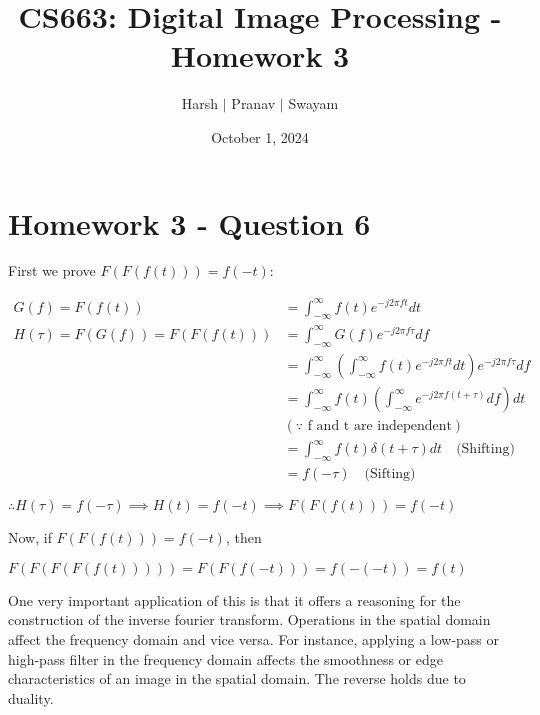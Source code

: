 \documentclass{article}
\title{CS663: Digital Image Processing - Homework 3}
\author{Harsh $\vert$ Pranav $\vert$ Swayam}
\date{October 1, 2024}
\begin{document}
\maketitle
\section{Homework 3 - Question 6}

First we prove \( F(F(f(t))) = f(-t) \):

\begin{align*}
    G(f) = F(f(t)) &= \int_{-\infty}^{\infty} f(t) e^{-j 2 \pi f t} dt \\
    H(\tau) = F(G(f)) = F(F(f(t))) &= \int_{-\infty}^{\infty} G(f) e^{-j 2 \pi f \tau} df \\
    &= \int_{-\infty}^{\infty} \left( \int_{-\infty}^{\infty} f(t) e^{-j 2 \pi f t} dt \right) e^{-j 2 \pi f \tau} df \\
    &= \int_{-\infty}^{\infty} f(t) \left( \int_{-\infty}^{\infty} e^{-j 2 \pi f (t + \tau)} df \right) dt \\ &(\because\text{ f and t are independent}) \\
    &= \int_{-\infty}^{\infty} f(t) \delta(t + \tau) dt \quad \text{(Shifting)} \\
    &= f(-\tau) \quad \text{(Sifting)}
\end{align*}

$\therefore H(\tau) = f(-\tau) \implies H(t) = f(-t) \implies F(F(f(t))) = f(-t)$

Now, if \( F(F(f(t))) = f(-t) \), then 

$F(F(F(F(f(t))))) = F(F(f(-t))) = f(-(-t)) = f(t)$


One very important application of this is that it offers a reasoning for the construction of the inverse fourier transform.
Operations in the spatial domain affect the frequency domain and vice versa. For instance, applying a low-pass or high-pass filter in the frequency domain affects the smoothness or edge characteristics of an image in the spatial domain. The reverse holds due to duality.
\end{document}
